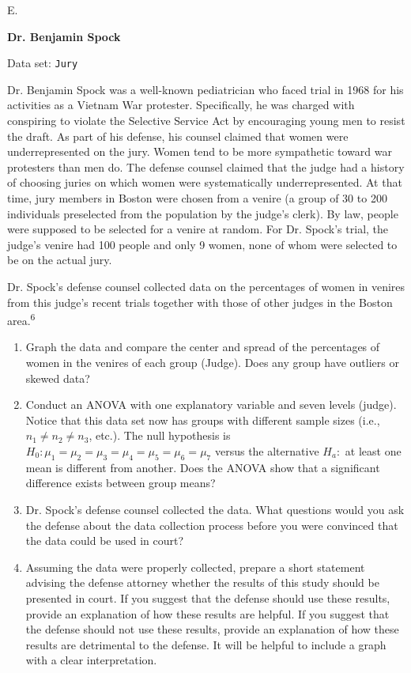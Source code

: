 \documentclass[
]{report}
\newcounter{excount}
\renewcommand{\theexcount}{E\arabic{excount}}
\begin{document}
\begin{list}{\theexcount.}{ \setlength{\itemsep}{1.2em}}
  \item \textbf{Dr. Benjamin Spock}

Data set: \texttt{Jury}

Dr. Benjamin Spock was a well-known pediatrician who faced trial in 1968 for his activities as a Vietnam War protester. Specifically, he was charged with conspiring to violate the Selective Service Act by encouraging young men to resist the draft. As part of his defense, his counsel claimed that women were underrepresented on the jury. Women tend to be more sympathetic toward war protesters than men do. The defense counsel claimed that the judge had a history of choosing juries on which women were systematically underrepresented. At that time, jury members in Boston were chosen from a venire (a group of 30 to 200 individuals preselected from the population by the judge’s clerk). By law, people were supposed to be selected for a venire at random. For Dr. Spock’s trial, the judge’s venire had 100 people and only 9 women, none of whom were selected to be on the actual jury.

Dr. Spock’s defense counsel collected data on the percentages of women in venires from this judge’s recent trials together with those of other judges in the Boston area.\textsuperscript{6}

    \begin{enumerate}
      \item Graph the data and compare the center and spread of the percentages of women in the venires of each group (Judge). Does any group have outliers or skewed data?
      \item Conduct an ANOVA with one explanatory variable and seven levels (judge). Notice that this data set now has groups with different sample sizes (i.e., $n_1 \ne n_2 \ne n_3$, etc.). The null hypothesis is $H_0\colon \mu_1 = \mu_2 = \mu_3 = \mu_4 = \mu_5 = \mu_6 = \mu_7$ versus the alternative $H_a\colon$ at least one mean is different from another. Does the ANOVA show that a significant difference exists between group means?
      \item Dr. Spock’s defense counsel collected the data. What questions would you ask the defense about the data collection process before you were convinced that the data could be used in court?
      \item Assuming the data were properly collected, prepare a short statement advising the defense attorney whether the results of this study should be presented in court. If you suggest that the defense should use these results, provide an explanation of how these results are helpful. If you suggest that the defense should not use these results, provide an explanation of how these results are detrimental to the defense. It will be helpful to include a graph with a clear interpretation.
    \end{enumerate}


\end{list}
\end{document}
